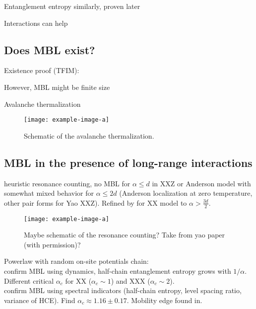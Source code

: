 Entanglement entropy similarly\cite{bardarsonUnboundedGrowthEntanglement2012}, proven later\cite{huangExtensiveEntropyUnitary2021}

Interactions can help\cite{huangInteractionenhancedManybodyLocalization2024}

\subsection{Does MBL exist?}
Existence proof (TFIM): \cite{imbrieManyBodyLocalizationQuantum2016}

However, MBL might be finite size

Avalanche thermalization

\begin{figure}[htb]
	\centering
	\texttt{[image: example-image-a]}
	\caption{Schematic of the avalanche thermalization.}
\end{figure}

\subsection{MBL in the presence of long-range interactions}

heuristic resonance counting, no MBL for $\alpha\leq d$ in XXZ \cite{yaoManyBodyLocalizationDipolar2014,burinManybodyDelocalizationStrongly2015,gutmanEnergyTransportAnderson2016} or Anderson model \cite{burinEnergyDelocalizationStrongly2006} with somewhat mixed behavior for $\alpha\leq 2d$ (Anderson localization at zero temperature, other pair forms for Yao XXZ). Refined by \cite{burinLocalizationRandomXY2015} for XX model to $\alpha > \frac{3d}{2}$.

\begin{figure}[htb]
	\centering
	\texttt{[image: example-image-a]}
	\caption{Maybe schematic of the resonance counting? Take from yao paper (with permission)?}
\end{figure}

Powerlaw with random on-site potentials chain:\\ \cite{safavi-nainiQuantumDynamicsDisordered2019} confirm MBL using dynamics, half-chain entanglement entropy grows with $1/\alpha$. Different critical $\alpha_c$ for XX ($\alpha_c\sim1$) and XXX ($\alpha_c\sim2$). \\
\cite{schifferManybodyLocalizationSpin2019} confirm MBL using spectral indicators (half-chain entropy, level spacing ratio, variance of HCE). Find $\alpha_c \approx 1.16\pm0.17$. Mobility edge found in\cite{yousefjaniMobilityEdgeLongrange2023}.

